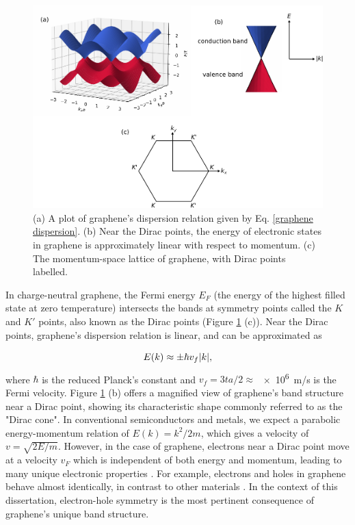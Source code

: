 \documentclass[double,12pt,1in]{beavtex}
\begin{document}
\begin{figure}
    \includegraphics[width = 1\textwidth]{Graphene band structure 3D.pdf}
    \caption{(a) A plot of graphene's dispersion relation given by Eq. \ref{graphene dispersion}. (b) Near the Dirac points, the energy of electronic states in graphene is approximately linear with respect to momentum. (c) The momentum-space lattice of graphene, with Dirac points labelled.}
    \label{graphene dispersion plot}
\end{figure}
In charge-neutral graphene, the Fermi energy $E_F$ (the energy of the highest filled state at zero temperature) intersects the bands at symmetry points called the $K$ and $K'$ points, also known as the Dirac points (Figure \ref{graphene dispersion plot} (c)). Near the Dirac points, graphene's dispersion relation is linear, and can be approximated as


\begin{equation}
    E(k) \approx \pm \hbar v_f \abs{k}, \label{linear dispersion of graphene}
\end{equation}
where $\hbar$ is the reduced Planck's constant and $v_f = 3ta/2  \approx \; $\SI{e6}{\meter/\second} is the Fermi velocity. Figure \ref{graphene dispersion plot} (b) offers a magnified view of graphene's band structure near a Dirac point, showing its characteristic shape commonly referred to as the "Dirac cone". In conventional semiconductors and metals, we expect a parabolic energy-momentum relation of $E(k) = k^2/2m$, which gives a velocity of $v = \sqrt{2E/m}$. However, in the case of graphene, electrons near a Dirac point move at a velocity $v_F$ which is independent of both energy and momentum, leading to many unique electronic properties \cite{castro_neto_electronic_2009}. For example, electrons and holes in graphene behave almost identically, in contrast to other materials \cite{novoselov_electronic_2007,castro_neto_electronic_2009}. In the context of this dissertation, electron-hole symmetry is the most pertinent consequence of graphene’s unique band structure.
\end{document}
